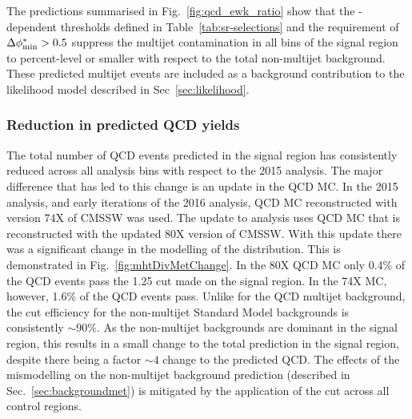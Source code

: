 
The predictions summarised in Fig.~\ref{fig:qcd_ewk_ratio} show that 
the \HT-dependent \alphat thresholds defined in Table~\ref{tab:sr-selections} 
and the requirement of $\mbox{$\Delta\phi^{*}_{\rm min}$} > 0.5$ suppress the multijet
contamination in all bins of the signal region to percent-level or smaller with
respect to the total non-multijet background. These predicted multijet events are 
included as a background contribution to the likelihood model
described in Sec~\ref{sec:likelihood}.

\subsubsection{Reduction in predicted QCD yields}

The
total number of QCD events predicted in the signal region has consistently
reduced across all analysis bins with respect to the 2015 analysis. The major difference that has led to
this change is an update in the QCD MC.
In the 2015 analysis, and early iterations of the 2016 analysis,
QCD MC reconstructed with version 74X of CMSSW was used. The update to
analysis uses QCD MC that is reconstructed with the updated 80X
version of CMSSW. With this update there was a significant
change in the modelling of the \mhtmet distribution. This is
demonstrated in Fig.~\ref{fig:mhtDivMetChange}. In the 80X QCD MC
only 0.4\% of the QCD events pass the 1.25 \mhtmet cut made on the
signal region. In the 74X MC, however, 1.6\% of the QCD events pass.
Unlike for the QCD multijet background, the cut efficiency for the 
non-multijet Standard Model backgrounds is
consistently $\sim 90\%$. As the non-multijet backgrounds are dominant
in the signal region, this results in a small change to the total
prediction in the signal region, despite there being a factor $\sim 4$
change to the predicted QCD. The effects of the \mhtmet mismodelling
on the non-multijet background prediction (described in Sec.~\ref{sec:backgroundmet})
is mitigated by the application of the cut across all control regions.

